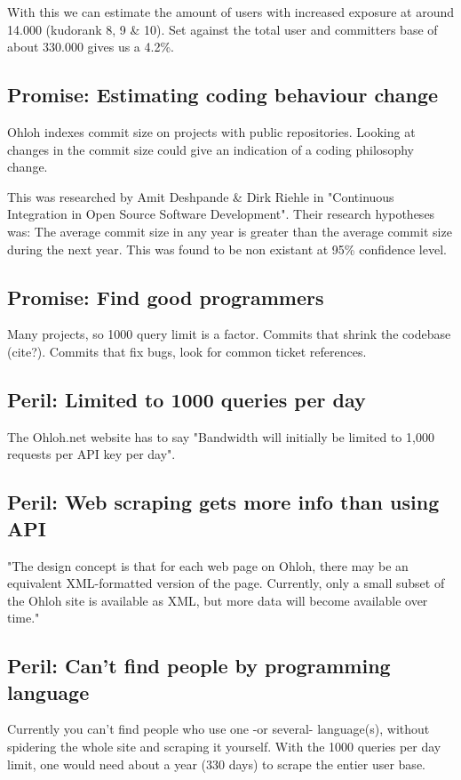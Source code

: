 \documentclass{sig-alternate}
\begin{document}
With this we can estimate the amount of users with increased exposure at around 14.000 (kudorank 8, 9 \& 10). Set against the total user and committers base of about 330.000 gives us a 4.2\%.


\subsection{Promise: Estimating coding behaviour change}
Ohloh indexes commit size on projects with public repositories. Looking at changes in the commit size could give an indication of a coding philosophy change.

This was researched by Amit Deshpande \& Dirk Riehle in "Continuous Integration in 
Open Source Software Development". Their research hypotheses was: The average commit size in any year is greater than the average commit size during the next year. This was found to be non existant at 95\% confidence level. \cite{Deshpande:2008p4463}


\subsection{Promise: Find good programmers}
Many projects, so 1000 query limit is a factor. Commits that shrink the codebase (cite?). Commits that fix bugs, look for common ticket references.


\subsection{Peril: Limited to 1000 queries per day}
The Ohloh.net website has to say "Bandwidth will initially be limited to 1,000 requests per API key per day".


\subsection{Peril: Web scraping gets more info than using API}
"The design concept is that for each web page on Ohloh, there may be an equivalent XML-formatted version of the page. Currently, only a small subset of the Ohloh site is available as XML, but more data will become available over time."


\subsection{Peril: Can't find people by programming language}
Currently you can't find people who use one -or several- language(s), without spidering the whole site and scraping it yourself. With the 1000 queries per day limit, one would need about a year (330 days) to scrape the entier user base.
\end{document}
